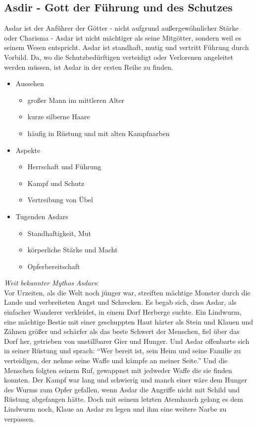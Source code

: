\subsection{\textbf{Asdir} - Gott der Führung und des Schutzes}
Asdar ist der Anführer der Götter - nicht aufgrund außergewöhnlicher Stärke oder Charisma - Asdar ist nicht mächtiger als seine Mitgötter, sondern weil es seinem Wesen entspricht. Asdar ist standhaft, mutig und 
vertritt Führung durch Vorbild. Da, wo die Schutzbedürftigen verteidigt oder Verlorenen angeleitet werden müssen, ist Asdar in der ersten Reihe zu finden. \\
\begin{itemize}
	\item Aussehen 
	\begin{itemize}
		\item großer Mann im mittleren Alter
		\item kurze silberne Haare
		\item häufig in Rüstung und mit alten Kampfnarben
	\end{itemize}
	\item Aspekte
	\begin{itemize}
		\item Herrschaft und Führung
		\item Kampf und Schutz
		\item Vertreibung von Übel
	\end{itemize}
	\item Tugenden Asdars
	\begin{itemize}
		\item Standhaftigkeit, Mut
		\item körperliche Stärke und Macht
		\item Opferbereitschaft
	\end{itemize}
\end{itemize}
\textit{Weit bekannter Mythos Asdars}:\\
Vor Urzeiten, als die Welt noch jünger war, streiften mächtige Monster durch die Lande und verbreiteten Angst und Schrecken. Es begab sich, dass Asdar, als einfacher Wanderer 
verkleidet, in einem Dorf Herberge suchte. Ein Lindwurm, eine mächtige Bestie mit einer geschuppten Haut härter als Stein und Klauen und Zähnen größer und schärfer als das 
beste Schwert der Menschen, fiel über das Dorf her, getrieben von unstillbarer Gier und Hunger. Und Asdar offenbarte sich in seiner Rüstung und sprach: ``Wer bereit ist, sein Heim 
und seine Familie zu verteidigen, der nehme seine Waffe und kämpfe an meiner Seite.'' Und die Menschen folgten seinem Ruf, gewappnet mit jedweder Waffe die sie finden konnten. 
Der Kampf war lang und schwierig und manch einer wäre dem Hunger des Wurms zum Opfer gefallen, wenn Asdar die Angriffe nicht mit Schild und Rüstung abgefangen hätte. Doch 
mit seinem letzten Atemhauch gelang es dem Lindwurm noch, Klaue an Asdar zu legen und ihm eine weitere Narbe zu verpassen.\\~\\

